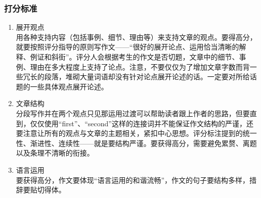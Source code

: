 \documentclass[UTF8]{ctexart}
\begin{document}
\subsubsection{打分标准}
\begin{enumerate}[A]
  \item 展开观点\\
  用各种支持内容（包括事例、细节、理由等）来支持文章的观点。要得高分，就要按照评分指导的原则写作文——“很好的展开论点、运用恰当清晰的解释、例证和斜街”。评分人会根据考生的作文是否切题，文章中的细节、事例、理由在多大程度上支持了论点。注意，不要仅仅为了增加文章字数而背一些冗长的段落，堆砌大量词语却没有针对论点展开论述的话。一定要对所给话题的一些具体观点展开论述。
  \item 文章结构\\
  分段写作并在两个观点只见那运用过渡可以帮助读者跟上作者的思路，但要直到，仅仅使用“first”、“second”这样的连接词并不能保证作文结构的严谨，还要注意让所有的观点与文章的主题相关，紧扣中心思想。评分标注提到的统一性、渐进性、连续性——就是要结构严谨。要获得高分，需要避免累赘、离题以及条理不清晰的衔接。
  \item 语言运用\\
  要获得高分，作文要体现“语言运用的和谐流畅”，作文的句子要结构多样，措辞要贴切得体。
\end{enumerate}
\end{document}

